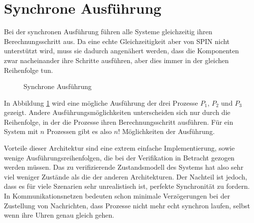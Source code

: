 \section{Synchrone Ausführung}
Bei der synchronen Ausführung führen alle Systeme gleichzeitig ihren Berechnungsschritt aus.
Da eine echte Gleichzeitigkeit aber von SPIN nicht unterstützt wird, muss sie dadurch angenähert werden, dass die Komponenten zwar nacheinander ihre Schritte ausführen, aber dies  immer in der gleichen Reihenfolge tun.

\begin{figure}[h]
  \centering
  \caption{Synchrone Ausführung}
  \label{fig:synchronized_execution}
\end{figure}

In Abbildung \ref{fig:synchronized_execution} wird eine mögliche Ausführung der drei Prozesse $P_1$, $P_2$ und $P_3$ gezeigt.
Andere Ausführungsmöglichkeiten unterscheiden sich nur durch die Reihenfolge, in der die Prozesse ihren Berechnungsschritt ausführen.
Für ein System mit $n$ Prozessen gibt es also $n!$ Möglichkeiten der Ausführung.

Vorteile dieser Architektur sind eine extrem einfache Implementierung, sowie wenige Ausführungsreihenfolgen, die bei der Verifikation in Betracht gezogen werden müssen.
Das zu verifizierende Zustandsmodell des Systems hat also sehr viel weniger Zustände als die der anderen Architekturen.
Der Nachteil ist jedoch, dass es für viele Szenarien sehr unrealistisch ist, perfekte Synchronität zu fordern.
In Kommunikationsnetzen bedeuten schon minimale Verzögerungen bei der Zustellung von Nachrichten, dass Prozesse nicht mehr echt synchron laufen, selbst wenn ihre Uhren genau gleich gehen.

